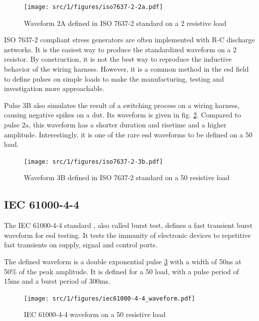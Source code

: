 \begin{figure}[!h]
  \centering
  \texttt{[image: src/1/figures/iso7637-2-2a.pdf]}
  \caption{Waveform 2A defined in ISO 7637-2 standard on a 2\textOmega{} resistive load}
  \label{fig:iso_2a_pulse}
\end{figure}

ISO 7637-2 compliant stress generators are often implemented with R-C discharge networks.
It is the easiest way to produce the standardized waveform on a 2\textOmega{} resistor.
By construction, it is not the best way to reproduce the inductive behavior of the wiring harness.
However, it is a common method in the \gls{esd} field to define pulses on simple loads to make the manufacturing, testing and investigation more approachable.

Pulse 3B also simulates the result of a switching process on a wiring harness, causing negative spikes on a \gls{dut}.
Its waveform is given in fig. \ref{fig:iso_2b_pulse}.
Compared to pulse 2a, this waveform has a shorter duration and risetime and a higher amplitude.
Interestingly, it is one of the rare \gls{esd} waveforms to be defined on a 50\textOmega{} load.

\begin{figure}[!h]
  \centering
  \texttt{[image: src/1/figures/iso7637-2-3b.pdf]}
  \caption{Waveform 3B defined in ISO 7637-2 standard on a 50\textOmega{} resistive load}
  \label{fig:iso_2b_pulse}
\end{figure}

\subsection{IEC 61000-4-4}

The IEC 61000-4-4 standard \cite{iec61000-4-4}, also called burst test, defines a fast transient burst waveform for \gls{esd} testing.
It tests the immunity of electronic devices to repetitive fast transients on supply, signal and control ports.

The defined waveform is a double exponential pulse \ref{fig:iec_4_4_pulse} with a width of 50ns at 50\% of the peak amplitude.
It is defined for a 50\textOmega{} load, with a pulse period of 15ms and a burst period of 300ms.

\begin{figure}[!h]
  \centering
  \texttt{[image: src/1/figures/iec61000-4-4\_waveform.pdf]}
  \caption{IEC 61000-4-4 waveform on a 50\textOmega{} resistive load}
  \label{fig:iec_4_4_pulse}
\end{figure}

